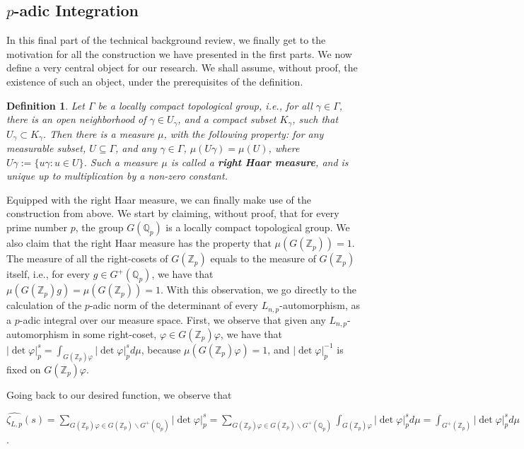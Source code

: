 \documentclass[12pt]{article}
\newtheorem{definition}[theorem]{Definition}
\begin{document}
\subsection{$p$-adic Integration}
In this final part of the technical background review, we finally get to the motivation for all the construction we have presented in the first parts. We now define a very central object for our research. We shall assume, without proof, the existence of such an object, under the prerequisites of the definition.
\begin{definition}
\label{def.right.haar.measure}
Let $\Gamma$ be a locally compact topological group, i.e., for all $\gamma\in\Gamma$, there is an open neighborhood of $\gamma\in U_{\gamma}$, and a compact subset $K_{\gamma}$, such that $U_{\gamma}\subset K_{\gamma}$. Then there is a measure $\mu$, with the following property: for any measurable subset, $U\subseteq\Gamma$, and any $\gamma\in\Gamma$, $\mu(U\gamma)=\mu(U)$, where $U\gamma:=\{u\gamma : u\in U\}$. Such a measure $\mu$ is called a \textbf{right Haar measure}, and is unique up to multiplication by a non-zero constant.
\end{definition}
Equipped with the right Haar measure, we can finally make use of the construction from above. We start by claiming, without proof, that for every prime number $p$, the group $G(\mathbb{Q}_p)$ is a locally compact topological group. We also claim that the right Haar measure has the property that $\mu(G(\mathbb{Z}_p))=1$. The measure of all the right-cosets of $G(\mathbb{Z}_p)$ equals to the measure of $G(\mathbb{Z}_p)$ itself, i.e., for every $g\in G^{+}(\mathbb{Q}_p)$, we have that $\mu(G(\mathbb{Z}_p)g)=\mu(G(\mathbb{Z}_p))=1$.
With this observation, we go directly to the calculation of the $p$-adic norm of the determinant of every $L_{n,p}$-automorphism, as a $p$-adic integral over our measure space.
First, we observe that given any $L_{n,p}$-automorphism in some right-coset, $\varphi\in G(\mathbb{Z}_p)\varphi$, we have that $|\det\varphi|_p^s=\displaystyle\int_{G(\mathbb{Z}_p)\varphi}|\det\varphi|_p^sd\mu$, because $\mu(G(\mathbb{Z}_p)\varphi)=1$, and $|\det\varphi|_p^{-1}$ is fixed on $G(\mathbb{Z}_p)\varphi$.\par
Going back to our desired function, we observe that\par $\hat{\zeta_{L,p}}(s)=\underset{\scriptscriptstyle G(\mathbb{Z}_p)\varphi\in G(\mathbb{Z}_p)\backslash G^+(\mathbb{Q}_p)}{\sum}|\det\varphi|_p^s=\underset{\scriptscriptstyle G(\mathbb{Z}_p)\varphi\in G(\mathbb{Z}_p)\backslash G^+(\mathbb{Q}_p)}{\sum}\displaystyle\int_{G(\mathbb{Z}_p)\varphi}|\det\varphi|_p^sd\mu=\displaystyle\int_{G^{+}(\mathbb{Z}_p)}|\det\varphi|_p^sd\mu$.\par 
\end{document}
